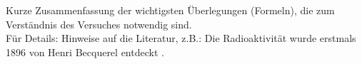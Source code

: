 Kurze Zusammenfassung der wichtigsten \"Uberlegungen (Formeln), die zum Verständnis des Versuches notwendig sind.\\
Für Details: Hinweise auf die Literatur, z.B.:
Die Radioaktivit\"at wurde erstmals 1896 von Henri Becquerel entdeckt \cite{Becquerel:261888}.
